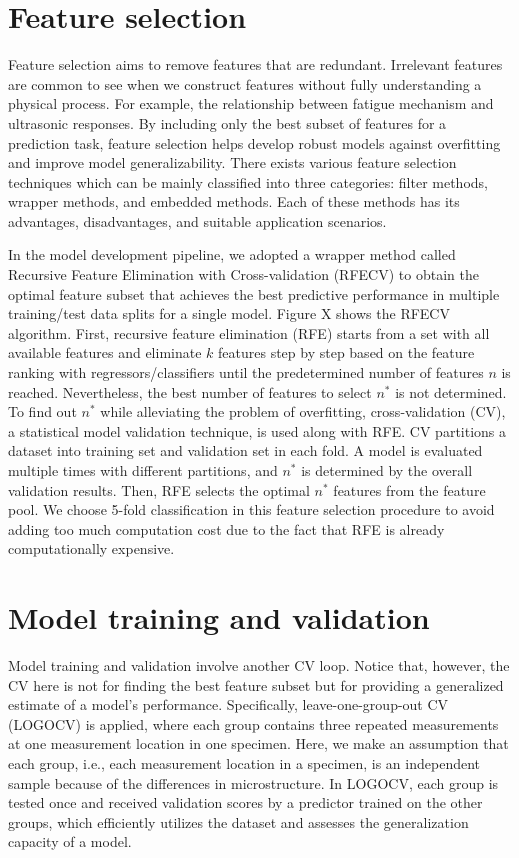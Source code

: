 \section{Feature selection}
Feature selection aims to remove features that are redundant. Irrelevant features are common to see when we construct features without fully understanding a physical process. For example, the relationship between fatigue mechanism and ultrasonic responses. By including only the best subset of features for a prediction task, feature selection helps develop robust models against overfitting and improve model generalizability. There exists various feature selection techniques which can be mainly classified into three categories: filter methods, wrapper methods, and embedded methods. Each of these methods has its advantages, disadvantages, and suitable application scenarios.

In the model development pipeline, we adopted a wrapper method called Recursive Feature Elimination with Cross-validation (RFECV) to obtain the optimal feature subset that achieves the best predictive performance in multiple training/test data splits for a single model. Figure X shows the RFECV algorithm. First, recursive feature elimination (RFE) starts from a set with all available features and eliminate $k$ features step by step based on the feature ranking with regressors/classifiers until the predetermined number of features $n$ is reached. Nevertheless, the best number of features to select $n^*$ is not determined. To find out $n^*$ while alleviating the problem of overfitting, cross-validation (CV), a statistical model validation technique, is used along with RFE. CV partitions a dataset into training set and validation set in each fold. A model is evaluated multiple times with different partitions, and $n^*$ is determined by the overall validation results. Then, RFE selects the optimal $n^*$ features from the feature pool. We choose 5-fold classification in this feature selection procedure to avoid adding too much computation cost due to the fact that RFE is already computationally expensive.

\section{Model training and validation}
Model training and validation involve another CV loop. Notice that, however, the CV here is not for finding the best feature subset but for providing a generalized estimate of a model's performance. Specifically, leave-one-group-out CV (LOGOCV) is applied, where each group contains three repeated measurements at one measurement location in one specimen. Here, we make an assumption that each group, i.e., each measurement location in a specimen, is an independent sample because of the differences in microstructure. In LOGOCV, each group is tested once and received validation scores by a predictor trained on the other groups, which efficiently utilizes the dataset and assesses the generalization capacity of a model.

